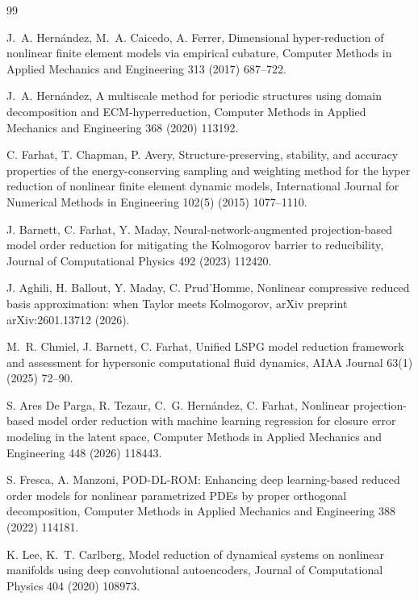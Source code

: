 \begin{thebibliography}{99}

J.~A. Hern\'andez, M.~A. Caicedo, A. Ferrer,
Dimensional hyper-reduction of nonlinear finite element models via empirical
cubature, Computer Methods in Applied Mechanics and Engineering 313 (2017)
687--722.

J.~A. Hern\'andez,
A multiscale method for periodic structures using domain decomposition and
ECM-hyperreduction, Computer Methods in Applied Mechanics and Engineering
368 (2020) 113192.

C. Farhat, T. Chapman, P. Avery,
Structure-preserving, stability, and accuracy properties of the
energy-conserving sampling and weighting method for the hyper reduction of
nonlinear finite element dynamic models, International Journal for Numerical
Methods in Engineering 102(5) (2015) 1077--1110.

J. Barnett, C. Farhat, Y. Maday,
Neural-network-augmented projection-based model order reduction for
mitigating the Kolmogorov barrier to reducibility, Journal of Computational
Physics 492 (2023) 112420.

J. Aghili, H. Ballout, Y. Maday, C. Prud'Homme,
Nonlinear compressive reduced basis approximation: when Taylor meets
Kolmogorov, arXiv preprint arXiv:2601.13712 (2026).

M.~R. Chmiel, J. Barnett, C. Farhat,
Unified LSPG model reduction framework and assessment for hypersonic
computational fluid dynamics, AIAA Journal 63(1) (2025) 72--90.

S. Ares De Parga, R. Tezaur, C.~G. Hern\'andez, C. Farhat,
Nonlinear projection-based model order reduction with machine learning
regression for closure error modeling in the latent space, Computer Methods
in Applied Mechanics and Engineering 448 (2026) 118443.

S. Fresca, A. Manzoni,
POD-DL-ROM: Enhancing deep learning-based reduced order models for nonlinear
parametrized PDEs by proper orthogonal decomposition, Computer Methods in
Applied Mechanics and Engineering 388 (2022) 114181.

K. Lee, K.~T. Carlberg,
Model reduction of dynamical systems on nonlinear manifolds using deep
convolutional autoencoders, Journal of Computational Physics 404 (2020)
108973.


\end{thebibliography}
